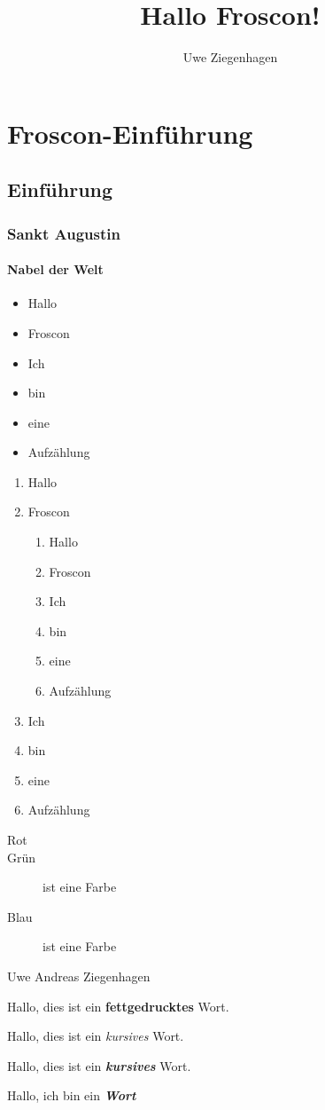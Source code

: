 \documentclass[ngerman]{scrreprt}
\title{Hallo Froscon!}
\author{Uwe Ziegenhagen}
\newcommand{\uzi}{Uwe Andreas Ziegenhagen}
\newcommand{\fk}[1]{\textbf{\textit{#1}}}
\begin{document}
\maketitle

\tableofcontents

\chapter{Froscon-Einführung}

\section{Einführung}

\subsection{Sankt Augustin}

\subsubsection{Nabel der Welt}


\blindtext[1]

\begin{itemize}
	\item Hallo
	\item Froscon
	\item Ich 
	\item bin 
	\item eine 
	\item Aufzählung
\end{itemize}

\begin{enumerate}
	\item Hallo
	\item Froscon
	
\begin{enumerate}
	\item Hallo
	\item Froscon
	\item Ich 
	\item bin 
	\item eine 
	\item Aufzählung
\end{enumerate}	
	
	\item Ich 
	\item bin 
	\item eine 
	\item Aufzählung
\end{enumerate}


\begin{description}
\item[Rot] \blindtext
\item[Grün] ist eine Farbe
\item[Blau] ist eine Farbe
\end{description}

\uzi

Hallo, dies ist ein \textbf{fettgedrucktes} Wort.

Hallo, dies ist ein \textit{kursives} Wort.

Hallo, dies ist ein \textbf{\textit{kursives}} Wort.

Hallo, ich bin ein \fk{Wort}
\end{document}
